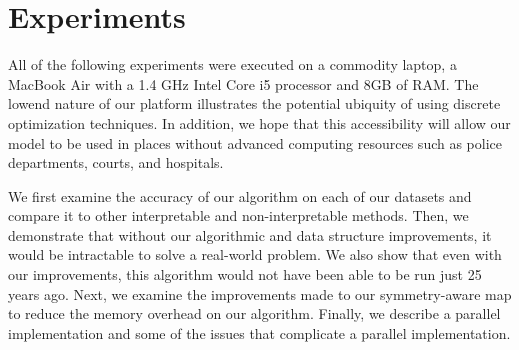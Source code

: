 \chapter{Experiments}

All of the following experiments were executed on a commodity laptop, a MacBook Air with a 1.4 GHz Intel Core i5 processor and 8GB of RAM.
The lowend nature of our platform illustrates the potential ubiquity of using discrete optimization techniques.
In addition, we hope that this accessibility will allow our model to be used in places without advanced computing resources such as police departments, courts, and hospitals.

We first examine the accuracy of our algorithm on each of our datasets and compare it to other interpretable and non-interpretable methods.
Then, we demonstrate that without our algorithmic and data structure improvements, it would be intractable to solve a real-world problem.
We also show that even with our improvements, this algorithm would not have been able to be run just 25 years ago.
Next, we examine the improvements made to our symmetry-aware map to reduce the memory overhead on our algorithm.
Finally, we describe a parallel implementation and some of the issues that complicate a parallel implementation.


